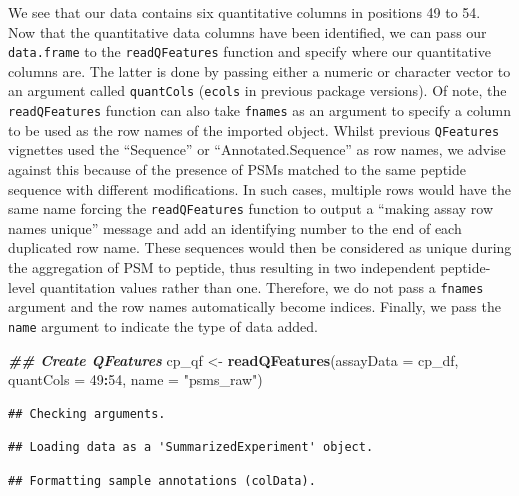 \documentclass[9pt,a4paper,]{extarticle}
\newenvironment{Shaded}{\begin{snugshade}}{\end{snugshade}}
\newcommand{\AttributeTok}[1]{\textcolor[rgb]{0.13,0.29,0.53}{#1}}
\newcommand{\DecValTok}[1]{\textcolor[rgb]{0.00,0.00,0.81}{#1}}
\newcommand{\DocumentationTok}[1]{\textcolor[rgb]{0.56,0.35,0.01}{\textbf{\textit{#1}}}}
\newcommand{\FunctionTok}[1]{\textcolor[rgb]{0.13,0.29,0.53}{\textbf{#1}}}
\newcommand{\NormalTok}[1]{#1}
\newcommand{\OtherTok}[1]{\textcolor[rgb]{0.56,0.35,0.01}{#1}}
\newcommand{\SpecialCharTok}[1]{\textcolor[rgb]{0.81,0.36,0.00}{\textbf{#1}}}
\newcommand{\StringTok}[1]{\textcolor[rgb]{0.31,0.60,0.02}{#1}}
\begin{document}
We see that our data contains six quantitative columns in positions 49 to 54.
Now that the quantitative data columns have been identified, we can pass our
\texttt{data.frame} to the \texttt{readQFeatures} function and specify where our quantitative
columns are. The latter is done by passing either a numeric or character vector
to an argument called \texttt{quantCols} (\texttt{ecols} in previous package versions).
Of note, the \texttt{readQFeatures} function can also take \texttt{fnames} as an argument to
specify a column to be used as the row names of the imported
object. Whilst previous \texttt{QFeatures} vignettes used the ``Sequence'' or
``Annotated.Sequence'' as row names, we advise against this because of the presence
of PSMs matched to the same peptide sequence with different modifications. In such
cases, multiple rows would have the same name forcing the \texttt{readQFeatures} function
to output a ``making assay row names unique'' message and add an identifying number
to the end of each duplicated row name. These sequences would then be considered
as unique during the aggregation of PSM to peptide, thus resulting in two independent
peptide- level quantitation values rather than one. Therefore, we do not pass a
\texttt{fnames} argument and the row names automatically become indices. Finally, we
pass the \texttt{name} argument to indicate the type of data added.

\begin{Shaded}
\begin{Highlighting}[]
\DocumentationTok{\#\# Create QFeatures }
\NormalTok{cp\_qf }\OtherTok{\textless{}{-}} \FunctionTok{readQFeatures}\NormalTok{(}\AttributeTok{assayData =}\NormalTok{ cp\_df,}
                       \AttributeTok{quantCols =} \DecValTok{49}\SpecialCharTok{:}\DecValTok{54}\NormalTok{,}
                       \AttributeTok{name =} \StringTok{"psms\_raw"}\NormalTok{)}
\end{Highlighting}
\end{Shaded}

\begin{verbatim}
## Checking arguments.
\end{verbatim}

\begin{verbatim}
## Loading data as a 'SummarizedExperiment' object.
\end{verbatim}

\begin{verbatim}
## Formatting sample annotations (colData).
\end{verbatim}
\end{document}
